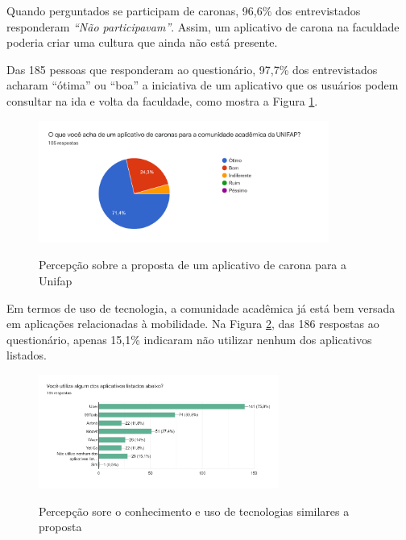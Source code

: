 Quando perguntados se participam de caronas, 96,6\% dos entrevistados responderam \textit{“Não participavam”}. Assim, um aplicativo de carona na faculdade poderia criar uma cultura que ainda não está presente.

Das 185 pessoas que responderam ao questionário, 97,7\% dos entrevistados acharam “ótima” ou “boa” a iniciativa de um aplicativo que os usuários podem consultar na ida e volta da faculdade, como mostra a Figura \ref{fig:percepcao}.

\begin{figure}[!hbtp]
	\centering
	\caption{Percepção sobre a proposta de um aplicativo de carona para a Unifap}
	\includegraphics[width=0.85\textwidth]{./04-figuras/questionario/15.png}
	\label{fig:percepcao}
\end{figure}


Em termos de uso de tecnologia, a comunidade acadêmica já está bem versada em aplicações relacionadas à mobilidade. Na Figura \ref{fig:conhecimento-sobre-apps}, das 186 respostas ao questionário, apenas 15,1\% indicaram não utilizar nenhum dos aplicativos listados.

\begin{figure}[!hbtp]
	\centering
	\caption{Percepção sore o conhecimento e uso de tecnologias similares a proposta}
	\includegraphics[width=0.7\textwidth]{./04-figuras/questionario/16.png}
	\label{fig:conhecimento-sobre-apps}
\end{figure}

